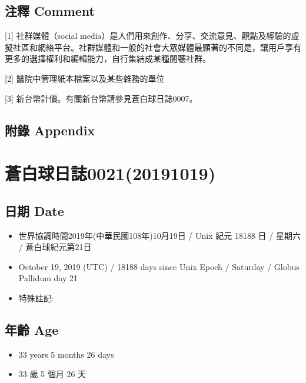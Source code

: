 \documentclass[a5paper, 12pt
]{book}
\providecommand{\tightlist}{%
  \setlength{\itemsep}{0pt}\setlength{\parskip}{0pt}}
\begin{document}
\hypertarget{ux6ce8ux91cb-comment-13}{%
\subsection{注釋 Comment}\label{ux6ce8ux91cb-comment-13}}

{[}1{]} 社群媒體（social
media）是人們用來創作、分享、交流意見、觀點及經驗的虛擬社區和網絡平台。社群媒體和一般的社會大眾媒體最顯著的不同是，讓用戶享有更多的選擇權利和編輯能力，自行集結成某種閱聽社群。

{[}2{]} 醫院中管理紙本檔案以及某些雜務的單位

{[}3{]} 新台幣計價。有關新台幣請參見蒼白球日誌0007。

\hypertarget{ux9644ux9304-appendix-12}{%
\subsection{附錄 Appendix}\label{ux9644ux9304-appendix-12}}

\hypertarget{ux84bcux767dux7403ux65e5ux8a8c002120191019}{%
\section{蒼白球日誌0021(20191019)}\label{ux84bcux767dux7403ux65e5ux8a8c002120191019}}

\hypertarget{ux65e5ux671f-date-18}{%
\subsection{日期 Date}\label{ux65e5ux671f-date-18}}

\begin{itemize}
\tightlist
\item
  世界協調時間2019年(中華民國108年)10月19日 / Unix 紀元 18188 日 /
  星期六 / 蒼白球紀元第21日
\item
  October 19, 2019 (UTC) / 18188 days since Unix Epoch / Saturday /
  Globus Pallidum day 21
\item
  特殊註記:
\end{itemize}

\hypertarget{ux5e74ux9f61-age-18}{%
\subsection{年齡 Age}\label{ux5e74ux9f61-age-18}}

\begin{itemize}
\tightlist
\item
  33 years 5 months 26 days
\item
  33 歲 5 個月 26 天
\end{itemize}
\end{document}
